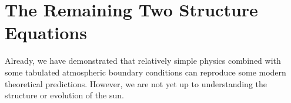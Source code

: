 \documentclass[12pt]{article}
\begin{document}
\section{The Remaining Two Structure Equations}

Already, we have demonstrated that relatively simple physics combined with some tabulated atmospheric boundary conditions can reproduce some modern theoretical predictions. However, we are not yet up to understanding the structure or evolution of the sun.
\end{document}
